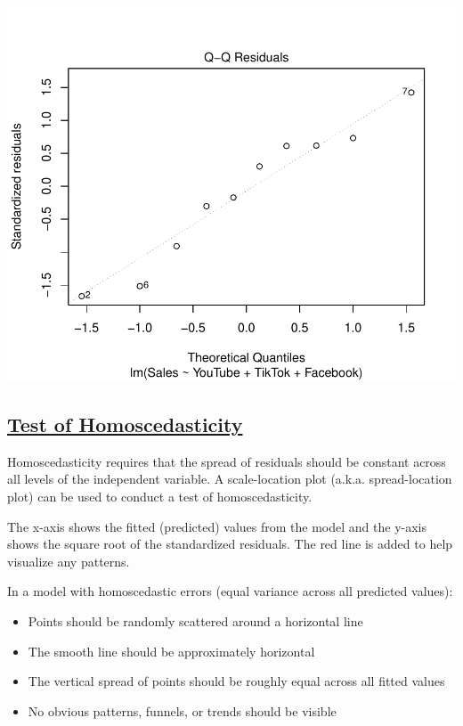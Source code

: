 \documentclass[
]{article}
\begin{document}
\includegraphics{2_multiple_linear_regression_files/figure-latex/test_of_normality-1.pdf}

\subsection{\texorpdfstring{\ul{\textbf{Test of
Homoscedasticity}}}{Test of Homoscedasticity}}\label{test-of-homoscedasticity}

Homoscedasticity requires that the spread of residuals should be
constant across all levels of the independent variable. A scale-location
plot (a.k.a. spread-location plot) can be used to conduct a test of
homoscedasticity.

The x-axis shows the fitted (predicted) values from the model and the
y-axis shows the square root of the standardized residuals. The red line
is added to help visualize any patterns.

In a model with homoscedastic errors (equal variance across all
predicted values):

\begin{itemize}
\item
  Points should be randomly scattered around a horizontal line
\item
  The smooth line should be approximately horizontal
\item
  The vertical spread of points should be roughly equal across all
  fitted values
\item
  No obvious patterns, funnels, or trends should be visible
\end{itemize}
\end{document}
